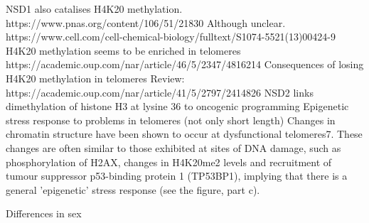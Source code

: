 NSD1 also catalises H4K20 methylation.
https://www.pnas.org/content/106/51/21830
Although unclear.
https://www.cell.com/cell-chemical-biology/fulltext/S1074-5521(13)00424-9
H4K20 methylation seems to be enriched in telomeres
https://academic.oup.com/nar/article/46/5/2347/4816214
Consequences of losing H4K20 methylation in telomeres
Review:
https://academic.oup.com/nar/article/41/5/2797/2414826
NSD2 links dimethylation of histone H3 at lysine 36 to oncogenic programming
Epigenetic stress response to problems in telomeres (not only short length)
Changes in chromatin structure have been shown to occur at dysfunctional telomeres7. These changes are often similar to those exhibited at sites of DNA damage, such as phosphorylation of H2AX, changes in H4K20me2 levels and recruitment of tumour suppressor p53-binding protein 1 (TP53BP1), implying that there is a general 'epigenetic' stress response (see the figure, part c).

Differences in sex
